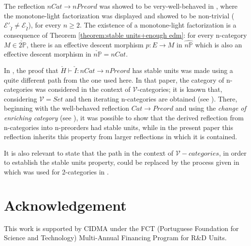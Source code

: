 \documentclass[12pt,a4paper]{amsart}
\theoremstyle{definition}
\begin{document}
The reflection $nCat\rightarrow nPreord$ was showed to be very-well-behaved in \cite{X:nml}, where the monotone-light factorization was displayed and showed to be non-trivial ($\mathcal{E}'_{\check{I}}\neq\mathcal{E}_{\check{I}}$), for every $n\geq 2$. The existence of a monotone-light factorization is a consequence of Theorem \ref{theorem:stable units+enough edm}: for every n-category $M\in\check{2\mathbb{P}}$, there is an effective descent morphism $p:E\rightarrow M$ in $\hat{n\mathbb{P}}$ which is also an effective descent morphism in $\check{n\mathbb{P}}=nCat$.

In \cite{X:nml}, the proof that $\check{H}\vdash\check{I}:nCat\rightarrow nPreord$ has stable units was made using a quite different path from the one used here. In that paper, the category of n-categories was considered in the context of $\mathcal{V}$-categories; it is known that, considering $\mathcal{V}=Set$ and then iterating n-categories are obtained (see \cite{Kelly:enriched_cat}). There, beginning with the well-behaved reflection $Cat\rightarrow Preord$ and using the \emph{change of enriching category} (see \cite{CruttwellPhD}), it was possible to show that the derived reflection from n-categories into n-preorders had stable units, while in the present paper this reflection inherits this property from larger reflections in which it is contained.

It is also relevant to state that the path in the context of $\mathcal{V}-categories$, in order to establish the stable units property, could be replaced by the process given in \cite{X:GenConComp} which was used for 2-categories in \cite{X:2ml}.





\section*{Acknowledgement}
This work is supported by CIDMA under the FCT (Portuguese Foundation for Science and Technology) Multi-Annual Financing Program for R\&D Units.
\end{document}

